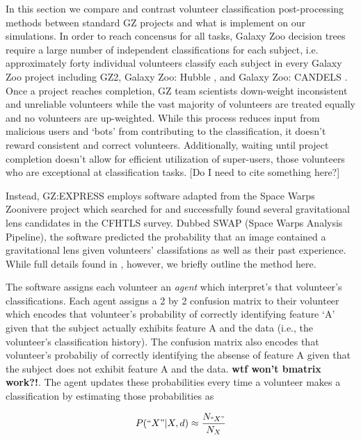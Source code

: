 \documentclass[twocolumn]{aastex6}
\begin{document}
In this section we compare and contrast volunteer classification post-processing
 methods between standard GZ projects and what is implement on our simulations. 
In order to reach concensus for all tasks, Galaxy Zoo decision trees require a large 
number of independent classifications for each subject, i.e.  approximately forty individual 
volunteers classify each subject in every Galaxy Zoo project including GZ2, Galaxy Zoo: 
Hubble \citep{Willett_submitted}, and Galaxy Zoo: CANDELS \citep{Simmons_submitted}. 
Once a project reaches completion, GZ team scientists down-weight inconsistent and unreliable 
volunteers while the vast majority of volunteers are treated equally and no volunteers are up-weighted.
While this process reduces input from malicious users and `bots' from contributing to the classification, 
it doesn't reward consistent and correct volunteers. Additionally, waiting until project completion 
doesn't allow for efficient utilization of super-users, those volunteers who are exceptional at 
classification tasks. [Do I need to cite something here?]

Instead, GZ:EXPRESS employs software adapted from the Space Warps Zoonivere project 
\citep{Marshall2016} which searched for and successfully found several gravitational lens 
candidates in the CFHTLS survey.  Dubbed SWAP (Space Warps Analysis Pipeline),  
the software predicted the probability that an image contained a gravitational lens given 
volunteers' classifations as well as their past experience. While full details found in 
\cite{Marshall2016}, however, we briefly outline the method here.  

The software assigns each volunteer an \textit{agent} which interpret's that volunteer's 
classifications. Each agent assigns a 2 by 2 confusion matrix to their volunteer which encodes
that volunteer's probability of correctly identifying feature `A'  given that the subject 
actually exhibits feature A and the data (i.e., the volunteer's classification history). 
The confusion matrix also encodes that volunteer's probabiliy of correctly identifying
the absense of feature A given that the subject does not exhibit feature A and the data. 
\textbf{wtf won't bmatrix work?!}. The agent updates these probabilities every time a 
volunteer makes a classification by estimating those probabilities as 

\begin{equation}
P(``X" | X, d) \approx \frac{N_{``X"}}{N_{X}}
\end{equation}
\end{document}
